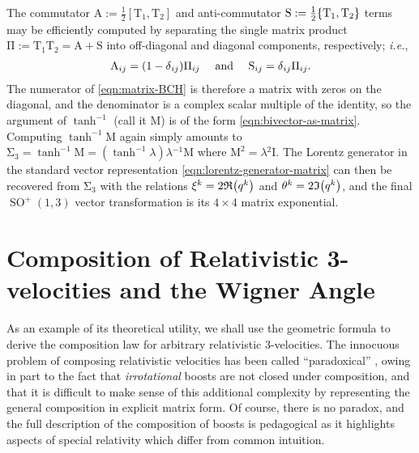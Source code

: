 \documentclass[12pt,a4paper]{article}
\makeatletter
\newcommand\x[1]{\@nameuse{\detokenize{#1}}}
\newcommand{\linmap}[1]{\mathrm{#1}}
\newcommand{\RE}[1]{\mathfrak{R}\qty(#1)}
\newcommand{\IM}[1]{\mathfrak{I}\qty(#1)}
\DeclareMathOperator{\SO}{SO}
\makeatother
\begin{document}
The commutator $\linmap A :={} \frac12[\linmap T_1, \linmap T_2]$ and anti-commutator $\linmap S :={} \frac12\qty{\linmap T_1, \linmap T_2}$ terms may be efficiently computed by separating the single matrix product $\linmap{ \Pi{} :={} T_1T_2 = A + S }$ into off-diagonal and diagonal components, respectively; \emph{i.e.},
\begin{align}
	\linmap A_{ij} = (1 - \delta{}_{ij})\linmap \Pi{}_{ij}
	\qqtext{ and }
	\linmap S_{ij} = \delta{}_{ij}\linmap \Pi{}_{ij}
.\end{align}
The numerator of \eqref{eqn:matrix-BCH} is therefore a matrix with zeros on the diagonal, and the denominator is a complex scalar multiple of the identity, so the argument of $\tanh^{-1}$ (call it $\linmap M$) is of the form \eqref{eqn:bivector-as-matrix}.
Computing $\tanh^{-1} \linmap M$ again simply amounts to
\begin{math}
	\linmap \Sigma{}_3 = \tanh^{-1} \linmap M = (\tanh^{-1} \lambda{})\lambda{}^{-1}\linmap M
\end{math}
where $\linmap M^2 = \lambda{}^2\linmap I$.
The Lorentz generator in the standard vector representation \eqref{eqn:lorentz-generator-matrix} can then be recovered from $\linmap \Sigma{}_3$ with the relations $\xi{}^k = 2\RE{q^k}$ and $\theta^k = 2\IM{q^k}$, and the final $\SO^+(1,3)$ vector transformation is its $4\times{}4$ matrix exponential.




\section{Composition of Relativistic 3-velocities and the Wigner Angle}

As an example of its theoretical utility, we shall use the geometric \x{BCH} formula to derive the composition law for arbitrary relativistic $3$-velocities.
The innocuous problem of composing relativistic velocities has been called ``paradoxical'' \cite{ungar1989sr-velocity-composition,mocanu1992sr-velocity-composition,visser2011sr-velocity-composition}, owing in part to the fact that \emph{irrotational} boosts are not closed under composition, and that it is difficult to make sense of this additional complexity by representing the general composition in explicit matrix form.
Of course, there is no paradox, and the full description of the composition of boosts is pedagogical as it highlights aspects of special relativity which differ from common intuition.
\end{document}
